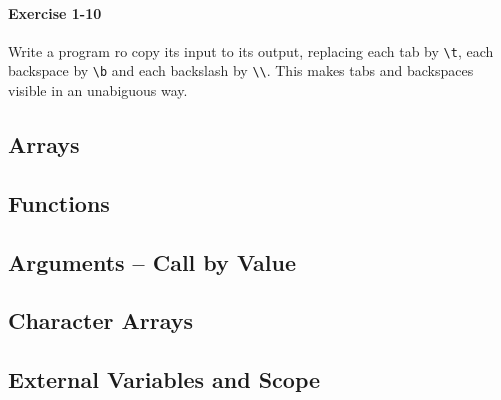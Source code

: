 		\paragraph{Exercise 1-10}
			Write a program ro copy its input to its output, replacing each tab by
			\lstinline{\t}, each backspace by \lstinline{\b} and each backslash by
			\lstinline{\\}. This makes tabs and backspaces visible in an unabiguous
			way.

			\hfill{}\cite[p.~20]{knr}
			

	\newpage
	\subsection{Arrays}
	\subsection{Functions}
	\subsection{Arguments -- Call by Value}
	\subsection{Character Arrays}
	\subsection{External Variables and Scope}
